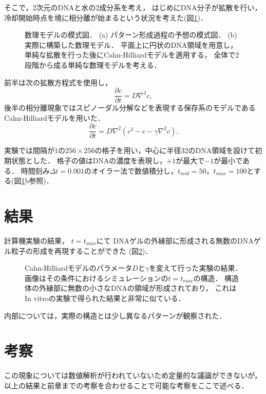 そこで，2次元のDNAと水の2成分系を考え，
はじめにDNA分子が拡散を行い，
冷却開始時点を境に相分離が始まるという状況を考えた(図\ref{fig:model_cahn_hilliard})．
\begin{figure}
    \centering
    
    \caption{
        数理モデルの模式図．
        (a) パターン形成過程の予想の模式図．
        (b) 実際に構築した数理モデル．
            平面上に円状のDNA領域を用意し，
            単純な拡散を行った後にCahn-Hilliardモデルを適用する，
            全体で2段階から成る単純な数理モデルを考える．
    }
    \label{fig:model_cahn_hilliard}
\end{figure}
前半は次の拡散方程式を使用し，
\begin{equation}
    \frac{\partial c}{\partial t}
    =
    D \nabla^{2} c
    ,
\end{equation}
後半の相分離現象ではスピノーダル分解などを表現する保存系のモデルであるCahn-Hilliardモデルを用いた．
\begin{equation}
    \frac{\partial c}{\partial t}
    =
    D \nabla^{2} \left( c^3 - c - \gamma \nabla^{2} c \right)
    .
\end{equation}

実験では間隔が$1$の$256\times 256$の格子を用い，中心に半径32のDNA領域を設けて初期状態とした．
格子の値はDNAの濃度を表現し，$+1$が最大で$-1$が最小である．
時間刻み$\Delta t=0.001$のオイラー法で数値積分し，$t_{mid}=50$，$t_{max}=100$とする(図\ref{fig:model_cahn_hilliard}b参照)．


\section{結果}
計算機実験の結果，
$t=t_{max}$にて
DNAゲルの外縁部に形成される無数のDNAゲル粒子の形成を再現することができた
(図\ref{fig:result_cahn_hilliard})．
\begin{figure}
    \centering
    
    \caption{
        Cahn-Hilliardモデルのパラメータ$D$と$\gamma$を変えて行った実験の結果．
        画像はその条件におけるシミュレーションの$t=t_{max}$の構造．
        構造体の外縁部に無数の小さなDNAの領域が形成されており，
        これはIn vitroの実験で得られた結果と非常に似ている．
    }
    \label{fig:result_cahn_hilliard}
\end{figure}
内部については，実際の構造とは少し異なるパターンが観察された．


\section{考察}
この現象については数値解析が行われていないため定量的な議論ができないが，
以上の結果と前章までの考察を合わせることで可能な考察をここで述べる．

